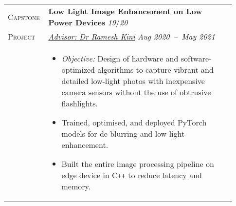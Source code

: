 \documentclass[letterpaper, 10pt, oneside]{article}
\newcommand{\stitle}[1]{\normalsize{\textsc{#1}}}
\newcommand{\bdit}[1]{{\textbf{#1}}}
\begin{document}
\begin{longtable}{@{} p{0.13\linewidth} p{0.8\linewidth}}
    \stitle{Capstone}    & \bdit{Low Light Image Enhancement on Low Power Devices} \hfill \textsl{19}/\textsl{20}                                                                                                                            \\
    \stitle{Project}     & \textsl{\href{https://ece.nitk.ac.in/faculty/ramesh-kini-m}{Advisor: Dr Ramesh Kini}} \hfill \textsl{Aug 2020\ --\ May 2021}                                                                                      \\
                         & \parbox{0.8\textwidth}{                                                                                                                                                                                           %
        \begin{itemize}[leftmargin=*, itemsep=-0.70ex, topsep=-0.88ex]
            \item \textsl{Objective:} Design of hardware and software-optimized algorithms to capture vibrant and detailed low-light photos with inexpensive camera sensors without the use of obtrusive flashlights.
            \item Trained, optimised, and deployed PyTorch models for de-blurring and low-light enhancement.
            \item Built the entire image processing pipeline on edge device in C\texttt{++} to reduce latency and memory.
        \end{itemize}
    }
    \\
    \\





\end{longtable}
\end{document}
